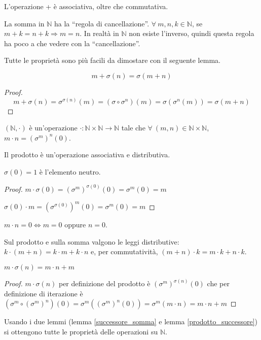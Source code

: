 L'operazione + \`e associativa, oltre che commutativa. 

La somma in $\mathbb{N}$ ha la ``regola di cancellazione''. $\forall \ m, n, k \in \mathbb{N}$, se $m + k = n + k \Rightarrow m = n$. In realt\`a in $\mathbb{N}$ non esiste l'inverso, quindi questa regola ha poco a che vedere con la ``cancellazione''.

Tutte le propriet\`a sono pi\`u facili da dimostare con il seguente lemma.
\begin{lem}\label{successore_somma}
\[
m + \sigma (n) = \sigma(m + n)
\]
\end{lem}
\begin{proof}
\[
m + \sigma(n) = \sigma^{\sigma(n)} (m) = (\sigma \circ \sigma^n) (m) = \sigma ( \sigma^n (m) ) = \sigma(m + n)
\]
\end{proof}
\begin{defn}
$(\mathbb{N}, \cdot)$ \`e un'operazione $\cdot : \mathbb{N} \times \mathbb{N} \to \mathbb{N}$ tale che $\forall \ (m, n) \in \mathbb{N} \times \mathbb{N}$, $m \cdot n = (\sigma^m)^n(0)$.
\end{defn}
Il prodotto \`e un'operazione associativa e distributiva.

\begin{prop}
$\sigma(0) = 1$ \`e l'elemento neutro.
\end{prop}
\begin{proof}
$m \cdot \sigma(0) = (\sigma^m)^{\sigma(0)} (0) = \sigma^m (0) = m$

$\sigma(0) \cdot m = (\sigma^{\sigma(0)})^m (0) = \sigma^m (0) = m$
\end{proof}

\begin{defn}
$m \cdot n = 0 \Leftrightarrow m = 0 $ oppure $ n = 0 $.
\end{defn}

Sul prodotto e sulla somma valgono le leggi distributive: $k \cdot (m+n) = k \cdot m + k \cdot n$ e, per commutativit\`a, $(m + n) \cdot k = m \cdot k + n \cdot k$.
\begin{lem}\label{prodotto_successore}
$m \cdot \sigma(n) = m \cdot n + m$
\end{lem}
\begin{proof}
$m \cdot \sigma(n)$ per definizione del prodotto \`e $ (\sigma^m)^{\sigma(n)} (0) $ che per definizione di iterazione \`e $ (\sigma^m \circ (\sigma^m)^n) (0) = \sigma^m ( (\sigma^m)^n (0)) = \sigma^m (m \cdot n) = m \cdot n + m$
\end{proof}
Usando i due lemmi (lemma \ref{successore_somma} e lemma \ref{prodotto_successore}) si ottengono tutte le propriet\`a delle operazioni su $\mathbb{N}$.

